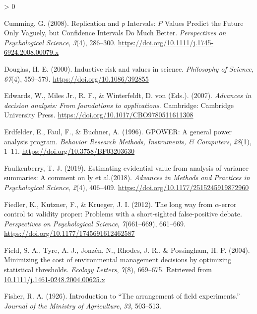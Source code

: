 \documentclass[
  english,
  ,man, a4paper,floatsintext]{apa6}
\newlength{\cslhangindent}
\newenvironment{CSLReferences}[2] %
 {%
  \setlength{\parindent}{0pt}
  \ifodd #1 \everypar{\setlength{\hangindent}{\cslhangindent}}\ignorespaces\fi
  \ifnum #2 > 0
  \setlength{\parskip}{#2\baselineskip}
  \fi
 }%
 {}
\begin{document}
\begin{CSLReferences}{1}{0}
\leavevmode\hypertarget{ref-cumming_replication_2008}{}%
Cumming, G. (2008). Replication and {\emph{p}} {Intervals}: {\emph{P}} {Values Predict} the {Future Only Vaguely}, but {Confidence Intervals Do Much Better}. \emph{Perspectives on Psychological Science}, \emph{3}(4), 286--300. \url{https://doi.org/10.1111/j.1745-6924.2008.00079.x}

\leavevmode\hypertarget{ref-douglas_inductive_2000}{}%
Douglas, H. E. (2000). Inductive risk and values in science. \emph{Philosophy of Science}, \emph{67}(4), 559--579. \url{https://doi.org/10.1086/392855}

\leavevmode\hypertarget{ref-edwards_advances_2007}{}%
Edwards, W., Miles Jr., R. F., \& Winterfeldt, D. von (Eds.). (2007). \emph{Advances in decision analysis: {From} foundations to applications}. Cambridge: Cambridge University Press. \url{https://doi.org/10.1017/CBO9780511611308}

\leavevmode\hypertarget{ref-erdfelder_gpower_1996}{}%
Erdfelder, E., Faul, F., \& Buchner, A. (1996). {GPOWER}: {A} general power analysis program. \emph{Behavior Research Methods, Instruments, \& Computers}, \emph{28}(1), 1--11. \url{https://doi.org/10.3758/BF03203630}

\leavevmode\hypertarget{ref-faulkenberry2019estimating}{}%
Faulkenberry, T. J. (2019). Estimating evidential value from analysis of variance summaries: A comment on ly et al.(2018). \emph{Advances in Methods and Practices in Psychological Science}, \emph{2}(4), 406--409. \url{https://doi.org/10.1177/2515245919872960}

\leavevmode\hypertarget{ref-fiedler_long_2012}{}%
Fiedler, K., Kutzner, F., \& Krueger, J. I. (2012). The long way from {\(\alpha\)}-error control to validity proper: {Problems with} a short-sighted false-positive debate. \emph{Perspectives on Psychological Science}, \emph{7}(661--669), 661--669. \url{https://doi.org/10.1177/1745691612462587}

\leavevmode\hypertarget{ref-field_minimizing_2004}{}%
Field, S. A., Tyre, A. J., Jonzén, N., Rhodes, J. R., \& Possingham, H. P. (2004). Minimizing the cost of environmental management decisions by optimizing statistical thresholds. \emph{Ecology Letters}, \emph{7}(8), 669--675. Retrieved from \href{https://10.1111/j.1461-0248.2004.00625.x}{10.1111/j.1461-0248.2004.00625.x}

\leavevmode\hypertarget{ref-fisher_introduction_1926}{}%
Fisher, R. A. (1926). Introduction to {``{The} arrangement of field experiments.''} \emph{Journal of the Ministry of Agriculture}, \emph{33}, 503--513.


\end{CSLReferences}
\end{document}
